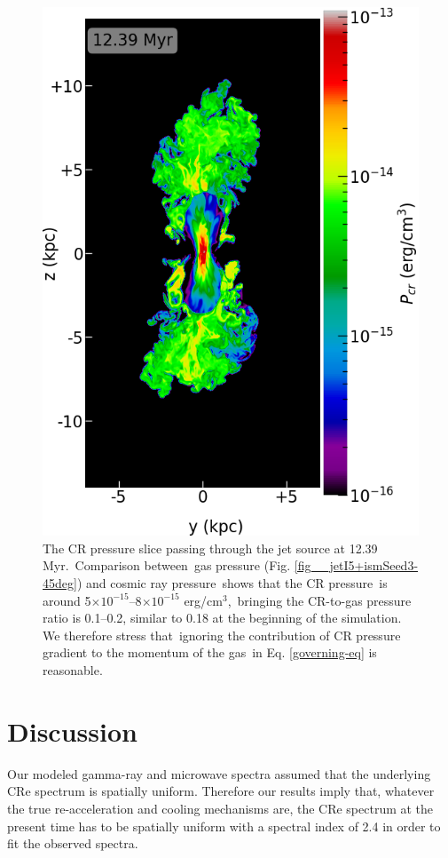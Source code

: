 \documentclass[fleqn,usenatbib,useAMS]{mnras}
\begin{document}
  \begin{figure}
    \includegraphics[width=\columnwidth]{figures/fig__jetI5+ismSeed3-45deg-CR.png}
    \caption{
     The CR pressure slice passing through the jet source at 12.39 Myr.\
     Comparison between\
     gas pressure (Fig. \ref{fig__jetI5+ismSeed3-45deg}) and cosmic ray pressure\
     shows that
     the CR pressure\
     is around 5$\times10^{-15}$--8$\times10^{-15}$ erg/cm$^{3}$,\
     bringing the CR-to-gas pressure ratio is 0.1--0.2,
     similar to 0.18 at the beginning of the simulation.
     We therefore stress that\
     ignoring the contribution of CR pressure gradient to the momentum of the gas\
     in Eq. \ref{governing-eq} is reasonable.
     }
    \label{fig__jetI5+ismSeed3-45deg-CR}
  \end{figure}

\section{Discussion}
Our modeled gamma-ray and microwave spectra assumed that
the underlying CRe spectrum is spatially uniform.
Therefore our results imply that, whatever the true re-acceleration and cooling mechanisms are,
the CRe spectrum at the present time has to be spatially uniform with
a spectral index of 2.4 in order to fit the observed spectra.
\end{document}
